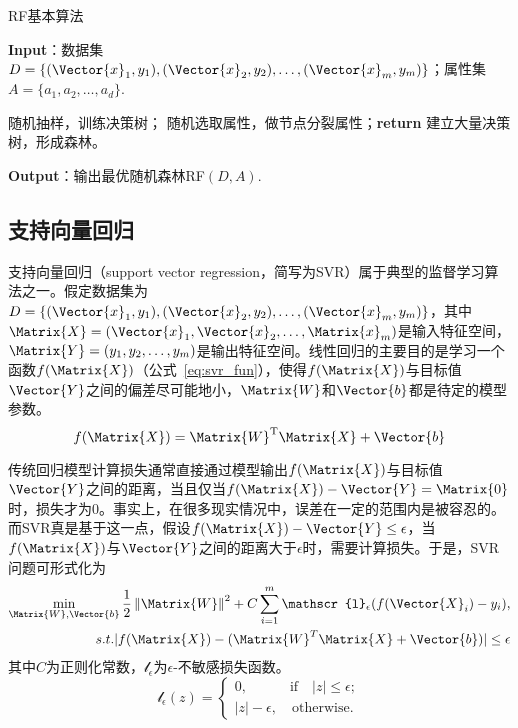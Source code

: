 \begin{algorithm}[!htbp]
  \small
  \caption{RF基本算法}\label{alg:random_forest}
  \textbf{Input}：{数据集$D=\{(\Vector{x}_1,y_1),(\Vector{x}_2,y_2),\ldots,(\Vector{x}_m,y_m)\}$；属性集$A=\{a_1,a_2,\ldots,a_d\}$.}
  \begin{algorithmic}[1]
    \State 随机抽样，训练决策树；
      \State 随机选取属性，做节点分裂属性；\textbf{return}
    \EndWhile
    \State 建立大量决策树，形成森林。
    \EndProcedure
  \end{algorithmic}
  \textbf{Output}：{输出最优随机森林RF$(D,A)$.}
\end{algorithm}


\subsection{支持向量回归}\label{sec:支持向量回归}

支持向量回归（support vector regression，简写为SVR）属于典型的监督学习算法之一。假定数据集为$D=\{(\Vector{x}_1,y_1),(\Vector{x}_2,y_2),\ldots,(\Vector{x}_m,y_m)\}$，其中$\Matrix{X}=(\Vector{x}_1,\Vector{x}_2,\ldots,\Matrix{x}_m)$是输入特征空间，$\Matrix{Y}=(y_1,y_2,\ldots,y_m)$是输出特征空间。线性回归的主要目的是学习一个函数$f(\Matrix{X})$（公式~\ref{eq:svr_fun}），使得$f(\Matrix{X})$与目标值$\Vector{Y}$之间的偏差尽可能地小，$\Matrix{W}$和$\Vector{b}$都是待定的模型参数。
\begin{equation}
  \label{eq:svr_fun}
  f(\Matrix{X})=\Matrix{W}^{\text{T}}\Matrix{X}+\Vector{b}
\end{equation}

传统回归模型计算损失通常直接通过模型输出$f(\Matrix{X})$与目标值$\Vector{Y}$之间的距离，当且仅当$f(\Matrix{X})-\Vector{Y}=\Matrix{0}$时，损失才为0。事实上，在很多现实情况中，误差在一定的范围内是被容忍的。而SVR真是基于这一点，假设$f(\Matrix{X})-\Vector{Y}\le \epsilon$，当$f(\Matrix{X})$与$\Vector{Y}$之间的距离大于$\epsilon$时，需要计算损失。于是，SVR问题可形式化为
\begin{equation}
  \label{eq:svr_min}
  \begin{split}
  \min\limits_{\Matrix{W},\Vector{b}}\frac{1}{2}\left\|\Matrix{W}\right\|^{2}+C\sum_{i=1}^{m}\mathscr{l}_{\epsilon}(f(\Vector{X}_i)-y_i),\\
  s.t.  
  |f(\Matrix{X})-(\Matrix{W}^{T}\Matrix{X}+\Vector{b})|\le \epsilon
  \end{split}
\end{equation}
其中$C$为正则化常数，$\mathscr{l}_{\epsilon}$为$\epsilon$-不敏感损失函数。
\begin{equation}
  \label{eq:svr_loss}
  \mathscr{l}_{\epsilon}(z)=
  \begin{cases}
    0,\qquad\quad \text{if}\quad |z|\le \epsilon;\\
    |z|-\epsilon,\quad \text{otherwise}.
  \end{cases}
\end{equation}

